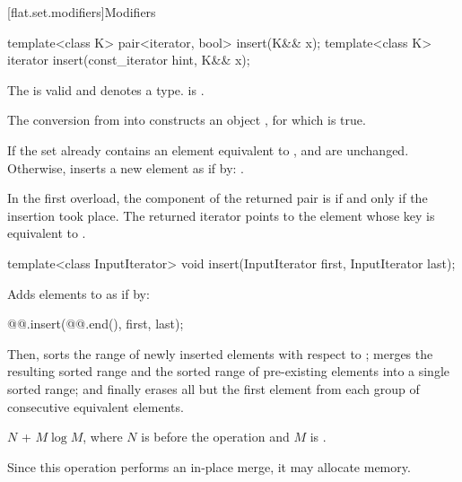 [flat.set.modifiers]{Modifiers}

%
\begin{itemdecl}
template<class K> pair<iterator, bool> insert(K&& x);
template<class K> iterator insert(const_iterator hint, K&& x);
\end{itemdecl}

\begin{itemdescr}
\pnum
\constraints
The  
is valid and denotes a type.
 is .

\pnum
\expects
The conversion from  into  constructs
an object , for which  is true.

\pnum
\effects
If the set already contains an element equivalent to ,
 and  are unchanged.
Otherwise,
inserts a new element as if by: .

\pnum
\returns
In the first overload,
the  component of the returned pair is 
if and only if the insertion took place.
The returned iterator points to the element
whose key is equivalent to .
\end{itemdescr}

%
\begin{itemdecl}
template<class InputIterator>
  void insert(InputIterator first, InputIterator last);
\end{itemdecl}

\begin{itemdescr}
\pnum
\effects
Adds elements to  as if by:
\begin{codeblock}
@@.insert(@@.end(), first, last);
\end{codeblock}
Then,
sorts the range of newly inserted elements with respect to ;
merges the resulting sorted range and
the sorted range of pre-existing elements into a single sorted range; and
finally erases all but the first element
from each group of consecutive equivalent elements.

\pnum
\complexity
$N$ + $M \log M$, where $N$ is  before the operation and
$M$ is .

\pnum
\remarks
Since this operation performs an in-place merge, it may allocate memory.
\end{itemdescr}

